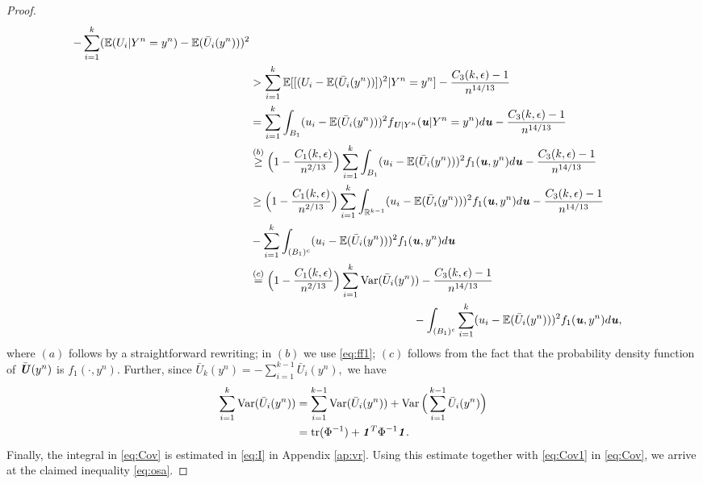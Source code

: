 \documentclass[11pt,onecolumn]{IEEEtran}
\def\mathbi#1{{\textbf{\textit #1}}}
\DeclareMathOperator{\tr}{tr}
\DeclareMathOperator{\Var}{Var}
\begin{document}
\begin{proof}
\begin{align}
- \sum_{i=1}^k ( \mathbb{E}(U_i|Y^n=y^n) - \mathbb{E}( \bar{U}_i(y^n) ) )^2 \nonumber\\
&> \sum_{i=1}^k \mathbb{E} [ [(U_i- \mathbb{E}( \bar{U}_i(y^n) ) ])^2 | Y^n=y^n ]-  \frac{C_3(k,\epsilon)-1}{n^{14/13}}\nonumber \\
&=  \sum_{i=1}^k \int_{ B_1} (u_i- \mathbb{E}( \bar{U}_i(y^n) ) )^2 f_{\mathbi{U}|Y^n}(\mathbi{u}|Y^n=y^n) d\mathbi{u}
-  \frac{C_3(k,\epsilon) -1}{n^{14/13}} \nonumber\\
& \overset{(b)}{\ge} \Big(1 - \frac{C_1(k,\epsilon)}{n^{2/13} } \Big) \sum_{i=1}^k \int_{ B_1} (u_i- \mathbb{E}( \bar{U}_i(y^n) ) )^2 f_1(\mathbi{u},y^n) d\mathbi{u}
-  \frac{C_3(k,\epsilon)-1}{n^{14/13}} \nonumber\\
&\ge  \Big(1 - \frac{C_1(k,\epsilon)}{n^{2/13} } \Big) \sum_{i=1}^k \int_{ \mathbb{R}^{k-1}} (u_i- \mathbb{E}( \bar{U}_i(y^n) ) )^2 f_1(\mathbi{u},y^n) d\mathbi{u}
-  \frac{C_3(k,\epsilon)-1}{n^{14/13}} \nonumber\\
  & - \sum_{i=1}^k \int_{ (B_1)^c} (u_i- \mathbb{E}( \bar{U}_i(y^n) ) )^2 f_1(\mathbi{u},y^n) d\mathbi{u} \nonumber\\
& \overset{(c)}{=} \Big(1 - \frac{C_1(k,\epsilon)}{n^{2/13} } \Big) 
\sum_{i=1}^k \Var( \bar{U}_i(y^n) ) 
  -  \frac{C_3(k,\epsilon)-1}{n^{14/13}}\nonumber\\
&\hspace*{2in}   -  \int_{ (B_1)^c} \sum_{i=1}^k (u_i- \mathbb{E}( \bar{U}_i(y^n) ) )^2 f_1(\mathbi{u},y^n) d\mathbi{u}, \label{eq:Cov}
\end{align}
where $(a)$ follows by a straightforward rewriting; in $(b)$ we use \eqref{eq:ff1}; $(c)$ follows from the fact that the probability density function of $\bar{\mathbi{U}}(y^n)$ is $f_1(\cdot,y^n).$ 
Further, since $\bar{U}_k (y^n) = -\sum_{i=1}^{k-1} \bar{U}_i  (y^n),$ we have
  \begin{align}
  \sum_{i=1}^k \Var( \bar{U}_i(y^n) )&=\sum_{i=1}^{k-1}\Var( \bar{U}_i(y^n) )+\Var\Big(\sum_{i=1}^{k-1}\bar{U}_i(y^n)\Big )\nonumber\\
  &=\tr(\Phi^{-1})+\mathbi{1}^T \Phi^{-1} \mathbi{1}.\label{eq:Cov1}
  \end{align}
  Finally, the integral in \eqref{eq:Cov} is estimated in \eqref{eq:I} in Appendix \ref{ap:vr}. Using this estimate together
  with \eqref{eq:Cov1} in \eqref{eq:Cov}, we arrive at the claimed inequality \eqref{eq:osa}.
\end{proof}
\end{document}
